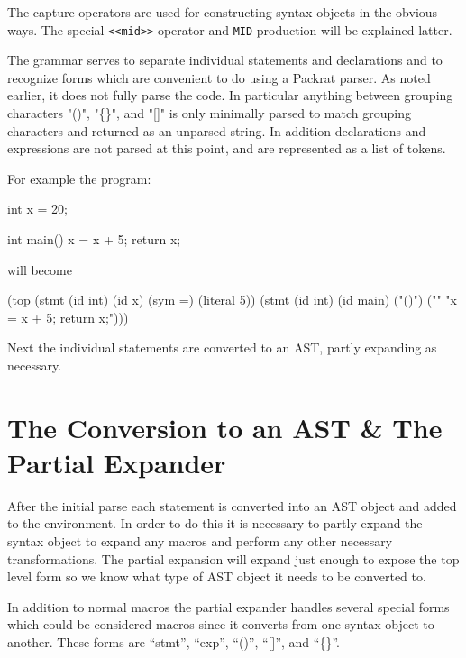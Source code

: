 \documentclass[12pt,english,letterpaper]{article}
\begin{document}
The capture operators are used for constructing syntax objects in the
obvious ways.  The special \verb/<<mid>>/ operator and \verb/MID/
production will be explained latter.

The grammar serves to separate individual statements and declarations
and to recognize forms which are convenient to do using a Packrat
parser.  As noted earlier, it does not fully parse the code.  In
particular anything between grouping characters "()", "\{\}", and "[]"
is only minimally parsed to match grouping characters and returned as
an unparsed string.  In addition declarations and expressions are not
parsed at this point, and are represented as a list of tokens.

For example the program:

\begin{code}
int x = 20;

int main() {
  x = x + 5;
  return x;
}
\end{code}

will become

\begin{code}
(top 
  (stmt (id int) (id x) (sym =) (literal 5))
  (stmt (id int) (id main) ("()") ("{}" "x = x + 5; return x;")))
\end{code}

Next the individual statements are converted to an AST, partly
expanding as necessary.

\section{The Conversion to an AST \& The Partial Expander}

After the initial parse each statement is converted into an AST object
and added to the environment.  In order to do this it is necessary to
partly expand the syntax object to expand any macros and perform any
other necessary transformations.  The partial expansion will expand just
enough to expose the top level form so we know what type of AST object
it needs to be converted to.

In addition to normal macros the partial expander handles several
special forms which could be considered macros since it converts
from one syntax object to another.  These forms are ``stmt'', ``exp'',
``()'', ``[]'', and ``\{\}''.
\end{document}
